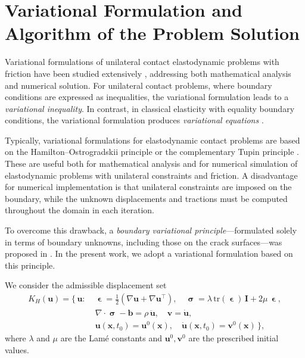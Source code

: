 \section{Variational Formulation and Algorithm of the Problem Solution}

Variational formulations of unilateral contact elastodynamic problems with friction have been studied extensively 
\cite{GuzZozulyaRef5,GuzZozulyaRef6,GuzZozulyaRef11,GuzZozulyaRef18,GuzZozulyaRef20,GuzZozulyaRef26,GuzZozulyaRef30}, 
addressing both mathematical analysis and numerical solution. 
For unilateral contact problems, where boundary conditions are expressed as inequalities, 
the variational formulation leads to a \emph{variational inequality}. 
In contrast, in classical elasticity with equality boundary conditions, the variational formulation produces 
\emph{variational equations} \cite{GuzZozulyaRef1,GuzZozulyaRef10,GuzZozulyaRef15,GuzZozulyaRef17}.

Typically, variational formulations for elastodynamic contact problems are based on the 
Hamilton--Ostrogradskii principle or the complementary Tupin principle 
\cite{GuzZozulyaRef26,GuzZozulyaRef30}. 
These are useful both for mathematical analysis and for numerical simulation of elastodynamic problems 
with unilateral constraints and friction. 
A disadvantage for numerical implementation is that unilateral constraints are imposed on the boundary, 
while the unknown displacements and tractions must be computed throughout the domain in each iteration.

To overcome this drawback, a \emph{boundary variational principle}---formulated solely in terms of boundary 
unknowns, including those on the crack surfaces---was proposed in \cite{GuzZozulyaRef30}. 
In the present work, we adopt a variational formulation based on this principle. 

We consider the admissible displacement set
\begin{equation}\label{GuzZozulyaEq22}
	\begin{aligned}
		K_H(\mathbf{u})=\bigl\{\, \mathbf{u}:\;
		& \bm{\upvarepsilon}=\tfrac12(\nabla\mathbf{u}+\nabla\mathbf{u}^{\!\top}), \quad
		\bm{\upsigma}=\lambda\,\mathrm{tr}(\bm{\upvarepsilon})\,\mathbf{I}+2\mu\,\bm{\upvarepsilon}, \\
		& \nabla\!\cdot\!\bm{\upsigma}-\mathbf{b}=\rho\,\ddot{\mathbf{u}}, \quad
		\mathbf{v}=\dot{\mathbf{u}}, \\
		& \mathbf{u}(\mathbf{x},t_0)=\mathbf{u}^0(\mathbf{x}),\quad 
		\dot{\mathbf{u}}(\mathbf{x},t_0)=\mathbf{v}^0(\mathbf{x})
		\,\bigr\},
	\end{aligned}
\end{equation}
where $\lambda$ and $\mu$ are the Lamé constants and $\mathbf{u}^0,\mathbf{v}^0$ are the prescribed initial values. 

